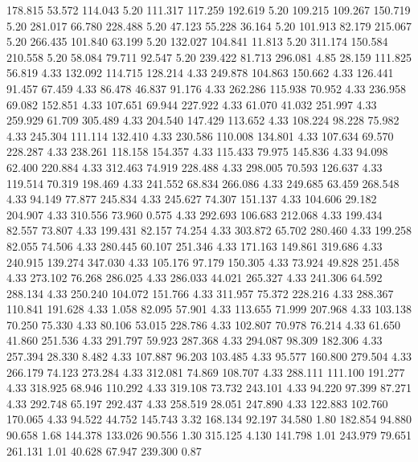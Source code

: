  178.815   53.572  114.043         5.20
 111.317  117.259  192.619         5.20
 109.215  109.267  150.719         5.20
 281.017   66.780  228.488         5.20
  47.123   55.228   36.164         5.20
 101.913   82.179  215.067         5.20
 266.435  101.840   63.199         5.20
 132.027  104.841   11.813         5.20
 311.174  150.584  210.558         5.20
  58.084   79.711   92.547         5.20
 239.422   81.713  296.081         4.85
  28.159  111.825   56.819         4.33
 132.092  114.715  128.214         4.33
 249.878  104.863  150.662         4.33
 126.441   91.457   67.459         4.33
  86.478   46.837   91.176         4.33
 262.286  115.938   70.952         4.33
 236.958   69.082  152.851         4.33
 107.651   69.944  227.922         4.33
  61.070   41.032  251.997         4.33
 259.929   61.709  305.489         4.33
 204.540  147.429  113.652         4.33
 108.224   98.228   75.982         4.33
 245.304  111.114  132.410         4.33
 230.586  110.008  134.801         4.33
 107.634   69.570  228.287         4.33
 238.261  118.158  154.357         4.33
 115.433   79.975  145.836         4.33
  94.098   62.400  220.884         4.33
 312.463   74.919  228.488         4.33
 298.005   70.593  126.637         4.33
 119.514   70.319  198.469         4.33
 241.552   68.834  266.086         4.33
 249.685   63.459  268.548         4.33
  94.149   77.877  245.834         4.33
 245.627   74.307  151.137         4.33
 104.606   29.182  204.907         4.33
 310.556   73.960    0.575         4.33
 292.693  106.683  212.068         4.33
 199.434   82.557   73.807         4.33
 199.431   82.157   74.254         4.33
 303.872   65.702  280.460         4.33
 199.258   82.055   74.506         4.33
 280.445   60.107  251.346         4.33
 171.163  149.861  319.686         4.33
 240.915  139.274  347.030         4.33
 105.176   97.179  150.305         4.33
  73.924   49.828  251.458         4.33
 273.102   76.268  286.025         4.33
 286.033   44.021  265.327         4.33
 241.306   64.592  288.134         4.33
 250.240  104.072  151.766         4.33
 311.957   75.372  228.216         4.33
 288.367  110.841  191.628         4.33
   1.058   82.095   57.901         4.33
 113.655   71.999  207.968         4.33
 103.138   70.250   75.330         4.33
  80.106   53.015  228.786         4.33
 102.807   70.978   76.214         4.33
  61.650   41.860  251.536         4.33
 291.797   59.923  287.368         4.33
 294.087   98.309  182.306         4.33
 257.394   28.330    8.482         4.33
 107.887   96.203  103.485         4.33
  95.577  160.800  279.504         4.33
 266.179   74.123  273.284         4.33
 312.081   74.869  108.707         4.33
 288.111  111.100  191.277         4.33
 318.925   68.946  110.292         4.33
 319.108   73.732  243.101         4.33
  94.220   97.399   87.271         4.33
 292.748   65.197  292.437         4.33
 258.519   28.051  247.890         4.33
 122.883  102.760  170.065         4.33
  94.522   44.752  145.743         3.32
 168.134   92.197   34.580         1.80
 182.854   94.880   90.658         1.68
 144.378  133.026   90.556         1.30
 315.125    4.130  141.798         1.01
 243.979   79.651  261.131         1.01
  40.628   67.947  239.300         0.87
